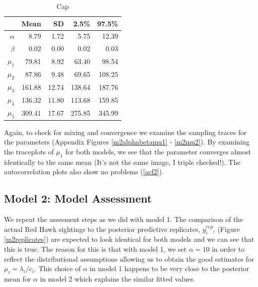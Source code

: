 \documentclass{asaproc}
\begin{document}
\begin{table}[ht]
\centering
\label{m2_table}
\caption{Cap}
\begin{tabular}{rrrrr}
  \hline
 & Mean & SD & 2.5\% & 97.5\% \\ 
  \hline
$\alpha$ & 8.79 & 1.72 & 5.75 & 12.39 \\ 
  $\beta$ & 0.02 & 0.00 & 0.02 & 0.03 \\ 
  $\mu_1$ & 79.81 & 8.92 & 63.40 & 98.54 \\ 
  $\mu_2$ & 87.86 & 9.48 & 69.65 & 108.25 \\ 
  $\mu_3$ & 161.88 & 12.74 & 138.64 & 187.76 \\ 
  $\mu_4$ & 136.32 & 11.80 & 113.68 & 159.85 \\ 
 $\mu_5$ & 309.41 & 17.67 & 275.85 & 345.99 \\ 
   \hline
\end{tabular}
\end{table}

Again, to check for mixing and convergence we examine the sampling traces for the parameters (Appendix Figures \ref{m2alphabetamu1} - \ref{m2mu2}). By examining the traceplots of $\mu_1$ for both models, we see that the parameter converges almost identically to the same mean (It's not the same image, I triple checked!). The autocorrelation plots also show no problems (\Figure \ref{acf2}).

\clearpage
\subsection{Model 2: Model Assessment}
We repeat the assesment steps as we did with model 1. The comparison of the actual Red Hawk sightings to the posterior predictive replicates, $y_i^{rep}$, (Figure \ref{m2replicates}) are expected to look identical for both models and we can see that this is true. The reason for this is that with model 1, we set $\alpha = 10$ in order to reflect the distributional assumptions allowing us to obtain the good estimates for $\mu_i = \lambda_i/c_i$. This choice of $\alpha$ in model 1 happens to be very close to the posterior mean for $\alpha$ in model 2 which explains the similar fitted values.
\end{document}
